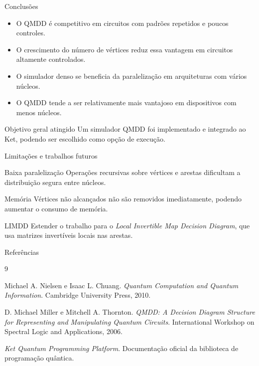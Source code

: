 \documentclass{beamer}
\begin{document}
\begin{frame}{Conclusões}
  \begin{itemize}
    \item O QMDD é competitivo em circuitos com padrões repetidos e poucos controles.
    \item O crescimento do número de vértices reduz essa vantagem em circuitos altamente controlados.
    \item O simulador denso se beneficia da paralelização em arquiteturas com vários núcleos.
    \item O QMDD tende a ser relativamente mais vantajoso em dispositivos com menos núcleos.
  \end{itemize}

  \begin{exampleblock}{Objetivo geral atingido}
    Um simulador QMDD foi implementado e integrado ao Ket, podendo ser escolhido como opção de execução.
  \end{exampleblock}
\end{frame}

\begin{frame}{Limitações e trabalhos futuros}
  \begin{block}{Baixa paralelização}
    Operações recursivas sobre vértices e arestas dificultam a distribuição segura entre núcleos.
  \end{block}

  \begin{block}{Memória}
    Vértices não alcançados não são removidos imediatamente, podendo aumentar o consumo de memória.
  \end{block}

  \begin{block}{LIMDD}
    Estender o trabalho para o \emph{Local Invertible Map Decision Diagram}, que usa matrizes invertíveis locais nas arestas.
  \end{block}
\end{frame}

\begin{frame}{Referências}
  \begin{thebibliography}{9}

      Michael A. Nielsen e Isaac L. Chuang.
      \emph{Quantum Computation and Quantum Information}.
      Cambridge University Press, 2010.

      D. Michael Miller e Mitchell A. Thornton.
      \emph{QMDD: A Decision Diagram Structure for Representing and
      Manipulating Quantum Circuits}.
      International Workshop on Spectral Logic and Applications, 2006.

      \emph{Ket Quantum Programming Platform}.
      Documentação oficial da biblioteca de programação quântica.

  \end{thebibliography}
\end{frame}

\end{document}
